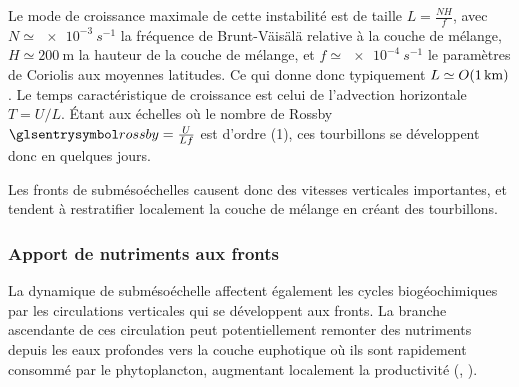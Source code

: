 \begin{note}
  Le mode de croissance maximale de cette instabilité est de taille \(L = \frac{NH}{f}\), avec \(N \simeq \qty{e-3}{s^{-1}}\) la fréquence de Brunt-Väisälä relative à la couche de mélange, \(H \simeq \qty{200}{\meter}\) la hauteur de la couche de mélange, et \(f \simeq \qty{e-4}{s^{-1}}\) le paramètres de Coriolis aux moyennes latitudes.
  Ce qui donne donc typiquement \(L \simeq \OM(\qty{1}{\km})\).
  Le temps caractéristique de croissance est celui de l'advection horizontale \(T = U/L\). Étant aux échelles où le nombre de Rossby \(\am{rossby} = \frac{U}{Lf}\) est d'ordre \OM(1), ces tourbillons se développent donc en quelques jours.
\end{note}

Les fronts de submésoéchelles causent donc des vitesses verticales importantes, et tendent à restratifier localement la couche de mélange en créant des tourbillons.

\subsubsection{Apport de nutriments aux fronts}
\label{sec:upwelling-nutriments}

La dynamique de submésoéchelle affectent également les cycles biogéochimiques par les circulations verticales qui se développent aux fronts.
La branche ascendante de ces circulation peut potentiellement remonter des nutriments depuis les eaux profondes vers la couche euphotique où ils sont rapidement consommé par le phytoplancton, augmentant localement la productivité (, \cite{klein_2009,calil_2011,mahadevan_2000,mahadevan_2016,mcwilliams_2016,levy_2001,levy_2012,levy_2018}).

